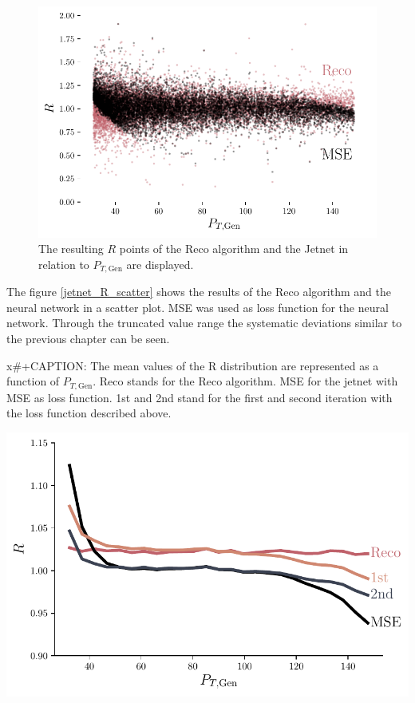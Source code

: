 \documentclass[12pt, a4paper]{thesis}
\begin{document}
\begin{figure}[htbp]
\centering
\includegraphics[width=.9\linewidth]{../images/jetnet_R_scatter.pdf}
\caption{\label{fig:orgf3be4f3}
The resulting \(R\) points of the Reco algorithm and the Jetnet in relation to \(P_{T, \text{Gen}}\) are displayed.}
\end{figure}

The figure \ref{jetnet_R_scatter} shows the results of the Reco
algorithm and the neural network in a scatter plot. MSE was used as
loss function for the neural network. Through the truncated value
range the systematic deviations similar to the previous chapter can be
seen.

x\#+CAPTION: The mean values of the R distribution are represented as a function of \(P_{T, \text{Gen}}\). Reco stands for the Reco algorithm. MSE for the jetnet with MSE as loss function. 1st and 2nd stand for the first and second iteration with the loss function described above.
\begin{center}
\includegraphics[width=.9\linewidth]{../images/jetnet_R.pdf}
\label{org74667ed}
\end{center}
\end{document}
